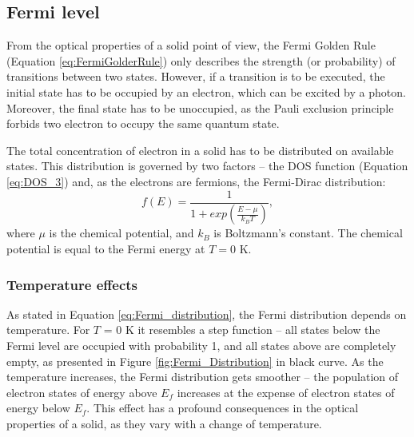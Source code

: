 \documentclass[titlepage,a4paper]{book}
\newcommand{\wciecie}{\quad\phantom{v}}
\begin{document}
\subsection{Fermi level}
\label{section:Fermi_level}
\wciecie

From the optical properties of a solid point of view, the Fermi Golden Rule (Equation \ref{eq:FermiGolderRule}) only describes the strength (or probability) of transitions between two states. However, if a transition is to be executed, the initial state has to be occupied by an electron, which can be excited by a photon. Moreover, the final state has to be unoccupied, as the Pauli exclusion principle forbids two electron to occupy the same quantum state. 

The total concentration of electron in a solid has to be distributed on available states. This distribution is governed by two factors -- the DOS function (Equation \ref{eq:DOS_3}) and, as the electrons are fermions, the Fermi-Dirac distribution:
\begin{equation}
\label{eq:Fermi_distribution}
f(E) = \frac{1}{1+exp\left(\frac{E-\mu}{k_B T}\right)},
\end{equation}
where $\mu$ is the chemical potential, and $k_B$ is Boltzmann's constant. The chemical potential is equal to the Fermi energy at $T = 0$ K.

\subsubsection{Temperature effects}
\wciecie

As stated in Equation \ref{eq:Fermi_distribution}, the Fermi distribution depends on temperature. For $T$ = 0 K it resembles a step function -- all states below the Fermi level are occupied with probability 1, and all states above are completely empty, as presented in Figure \ref{fig:Fermi_Distribution} in black curve. As the temperature increases, the Fermi distribution gets smoother -- the population of electron states of energy above $E_f$ increases at the expense of electron states of energy below $E_f$. This effect has a profound consequences in the optical properties of a solid, as they vary with a change of temperature.
\end{document}
